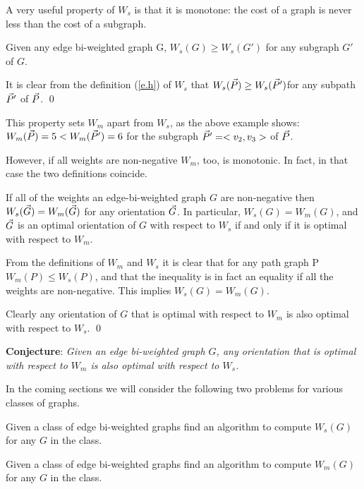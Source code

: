 A very useful property of $W_s$ is that it is monotone: the cost of a graph is never less than the cost of a subgraph.
\begin{lemma}\label{lem:sprop}
	Given any edge bi-weighted graph G,
	$W_{s}(G)\geq  W_{s}(G')$ for any subgraph $G'$ of $G$. 
\end{lemma}

It is clear from the definition (\ref{e.h}) of $W_s$ that $W_s(\vec{P})\geq W_s(\vec{P} ')$for any subpath 
$\vec{P} '$ of $\vec{P}$.  
\qed

This property sets $W_m$ apart from $W_s$,  as the above example shows:
$W_{m}(\vec{P})=5 <  W_{m}(\vec{P}')=6$ for the subgraph $\vec{P} '=<v_2,v_3>$ of $\vec{P}$.

However, if all weights are non-negative $W_m$, too, is monotonic. In fact, in that case the two definitions coincide.

\begin{lemma}
	If all of the weights an edge-bi-weighted graph $G$ are non-negative 
	then $W_{s}( \vec{G} )= W_{m}( \vec{G} )$ for any orientation $\vec{G}$.
	In particular,  $W_{s}(G)= W_{m}(G)$,  and 
	$\vec{G}$ is an optimal orientation of $G$ with respect to $W_{s}$
	if and only if it is optimal with respect to $ W_{m} $.
\end{lemma}
From the definitions of $W_m$ and $W_s$ it is clear that for any path graph P  $W_{m}(P)\leq  W_{s}(P)$, and that the inequality is in fact an equality if all the weights 
are non-negative. This implies $W_{s}(G)= W_{m}(G)$.

Clearly any orientation of $G$ that is optimal with respect to $W_m$ is also 
optimal with respect to $W_s$. 
\qed

\bigskip
{\bf Conjecture}:
\textit{Given an edge bi-weighted graph $G$, any orientation that is optimal with 
	respect to $W_{m}$ is also optimal with respect to $W_{s} $.}

\bigskip
In the coming sections we will consider the following two problems
for various classes of graphs.

\begin{problem}[
	HS]
	Given a class of edge bi-weighted graphs find an algorithm to compute
	$W_s(G) $
	for any $G$
	in the class.
\end{problem}

\begin{problem}[
	HM]
	Given a class of edge bi-weighted graphs find an algorithm to compute $W_m(G) $
	for any $G$
	in the class.
\end{problem}
